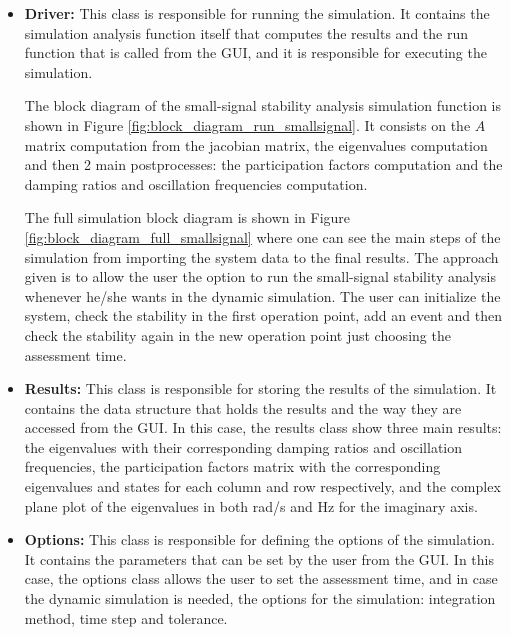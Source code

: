 \begin{itemize}
    \item \textbf{Driver:} This class is responsible for running the simulation. It contains the simulation analysis function itself
    that computes the results and the run function that is called from the GUI, and it is responsible for executing the simulation.

    The block diagram of the small-signal stability analysis simulation function is shown in Figure \ref{fig:block_diagram_run_smallsignal}. 
    It consists on the $A$ matrix computation from the jacobian matrix, the eigenvalues computation and then 2 main postprocesses: the participation factors
    computation and the damping ratios and oscillation frequencies computation. 
    
    The full simulation block diagram is shown in Figure \ref{fig:block_diagram_full_smallsignal} where one can see the main steps of the simulation from 
    importing the system data to the final results. The approach given is to allow the user the option to run the small-signal stability analysis
    whenever he/she wants in the dynamic simulation. The user can initialize the system, check the stability in the first operation point, add an event and
    then check the stability again in the new operation point just choosing the assessment time.

    \item \textbf{Results:} This class is responsible for storing the results of the simulation. It contains the data structure that holds the results
    and the way they are accessed from the GUI. In this case, the results class show three main results: the eigenvalues with their corresponding damping ratios
    and oscillation frequencies, the participation factors matrix with the corresponding eigenvalues and states for each column and row respectively,
    and the complex plane plot of the eigenvalues in both rad/s and Hz for the imaginary axis.

    \item \textbf{Options:} This class is responsible for defining the options of the simulation. It contains the parameters that can be set by the user
    from the GUI. In this case, the options class allows the user to set the assessment time, and in case the dynamic simulation is needed,
     the options for the simulation: integration method, time step and tolerance.
    
\end{itemize}

